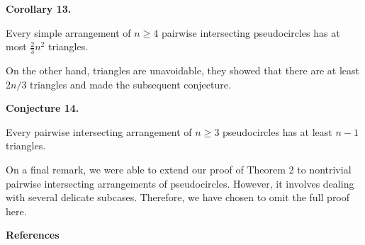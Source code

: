\documentclass[10pt,a4paper]{amsart}
\begin{document}
\par
\par\medskip\noindent\textbf{Corollary 13.}\par
Every simple arrangement of $n\geqslant 4$ pairwise intersecting pseudocircles has at most $\frac{2}{3}n^{2}$ triangles.
\par
\par
\par
On the other hand, triangles are unavoidable, they showed that there are at least $2n/3$ triangles and made the subsequent conjecture.
\par
\par
\par\medskip\noindent\textbf{Conjecture 14.}\par
Every pairwise intersecting arrangement of $n\geqslant 3$ pseudocircles has at least $n-1$ triangles.
\par
\par
\par
On a final remark, we were able to extend our proof of Theorem 2 to nontrivial pairwise intersecting arrangements of pseudocircles. However, it involves dealing with several delicate subcases. Therefore, we have chosen to omit the full proof here.
\par
\par
\par\medskip\noindent\textbf{References}\par
\end{document}
